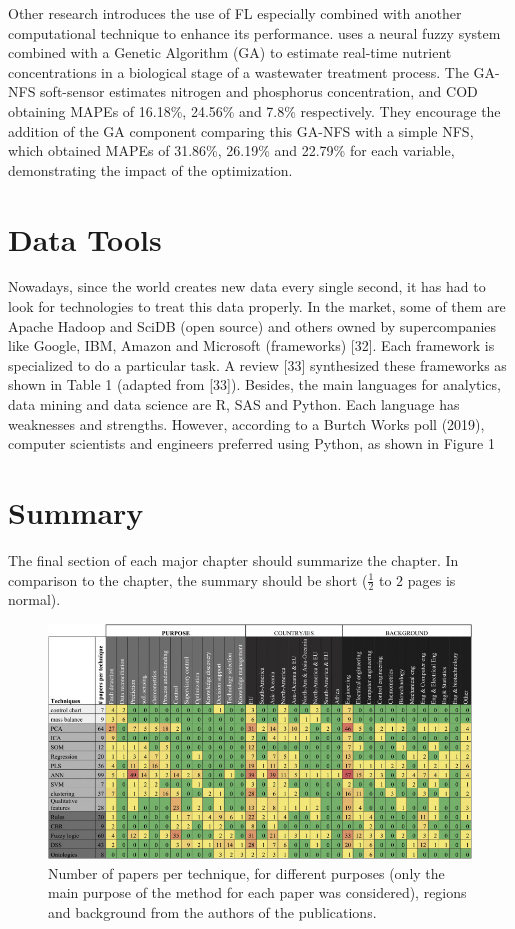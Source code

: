 Other research introduces the use of FL especially combined with another computational technique to enhance its performance. \cite{Huang2015} uses a neural fuzzy system combined with a Genetic Algorithm (GA) to estimate real-time nutrient concentrations in a biological stage of a wastewater treatment process. The GA-NFS soft-sensor estimates nitrogen and phosphorus concentration, and \ac{COD} obtaining MAPEs of 16.18\%, 24.56\% and 7.8\% respectively. They encourage the addition of the GA component comparing this GA-NFS with a simple NFS, which obtained MAPEs of 31.86\%, 26.19\% and 22.79\% for each variable, demonstrating the impact of the optimization.

\section{Data Tools}
\label{s:Related-Works-Data-Tools}

Nowadays, since the world creates new data every single second, it has had to look for technologies to treat this data properly. In the market, some of them are Apache Hadoop and SciDB (open source) and others owned by supercompanies like Google, IBM, Amazon and Microsoft (frameworks) [32]. Each framework is specialized to do a particular task. A review [33] synthesized these frameworks as shown in Table 1 (adapted from [33]). Besides, the main languages for analytics, data mining and data science are R, SAS and Python. Each language has weaknesses and strengths. However, according to a Burtch Works poll (2019), computer scientists and engineers preferred using Python, as shown in Figure 1

\section{Summary}
\label{s:Related-Works-Summary}

The final section of each major chapter should summarize the chapter. In comparison to the chapter, the summary should be short ($\frac{1}{2}$ to $2$ pages is normal).

\begin{figure}[t]
\centering
\includegraphics[width=16cm]{tables/PaperTable.jpg}
\caption{Number of papers per technique, for different purposes (only the main purpose of the method for each paper was considered), regions and background from the authors of the publications.}
\label{f:Papers Table}
\end{figure}

